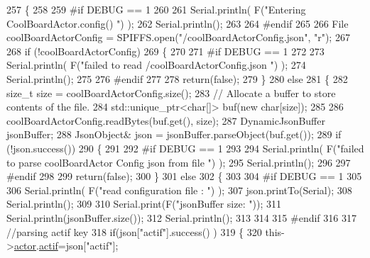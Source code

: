\begin{DoxyCode}
257 \{
258 
259 \textcolor{preprocessor}{#if DEBUG == 1 }
260 
261     Serial.println( F(\textcolor{stringliteral}{"Entering CoolBoardActor.config() "}) );
262     Serial.println();
263 
264 \textcolor{preprocessor}{#endif}
265 
266     File coolBoardActorConfig = SPIFFS.open(\textcolor{stringliteral}{"/coolBoardActorConfig.json"}, \textcolor{stringliteral}{"r"});
267 
268     \textcolor{keywordflow}{if} (!coolBoardActorConfig) 
269     \{
270 
271 \textcolor{preprocessor}{    #if DEBUG == 1 }
272 
273         Serial.println( F(\textcolor{stringliteral}{"failed to read /coolBoardActorConfig.json "}) );
274         Serial.println();
275 
276 \textcolor{preprocessor}{    #endif}
277 
278         \textcolor{keywordflow}{return}(\textcolor{keyword}{false});
279     \}
280     \textcolor{keywordflow}{else}
281     \{
282         \textcolor{keywordtype}{size\_t} size = coolBoardActorConfig.size();
283         \textcolor{comment}{// Allocate a buffer to store contents of the file.}
284         std::unique\_ptr<char[]> buf(\textcolor{keyword}{new} \textcolor{keywordtype}{char}[size]);
285 
286         coolBoardActorConfig.readBytes(buf.get(), size);
287         DynamicJsonBuffer jsonBuffer;
288         JsonObject& json = jsonBuffer.parseObject(buf.get());
289         \textcolor{keywordflow}{if} (!json.success()) 
290         \{
291         
292 \textcolor{preprocessor}{        #if DEBUG == 1 }
293 
294             Serial.println( F(\textcolor{stringliteral}{"failed to parse coolBoardActor Config  json from file "}) );
295             Serial.println();
296 
297 \textcolor{preprocessor}{        #endif}
298 
299             \textcolor{keywordflow}{return}(\textcolor{keyword}{false});
300         \} 
301         \textcolor{keywordflow}{else}
302         \{ 
303         
304 \textcolor{preprocessor}{        #if DEBUG == 1 }
305 
306             Serial.println( F(\textcolor{stringliteral}{"read configuration file : "}) );
307             json.printTo(Serial);
308             Serial.println();
309 
310             Serial.print(F(\textcolor{stringliteral}{"jsonBuffer size: "}));
311             Serial.println(jsonBuffer.size());
312             Serial.println();
313 
314         
315 \textcolor{preprocessor}{        #endif}
316   
317             \textcolor{comment}{//parsing actif key}
318             \textcolor{keywordflow}{if}(json[\textcolor{stringliteral}{"actif"}].success() )
319             \{
320                 this->\hyperlink{class_cool_board_actor_a8f190db9f7a39fddbcef7f152da970e9}{actor}.\hyperlink{struct_cool_board_actor_1_1state_a7963178c2de01ef0d2861f9f59ad6f3c}{actif}=json[\textcolor{stringliteral}{"actif"}];

\end{DoxyCode}
